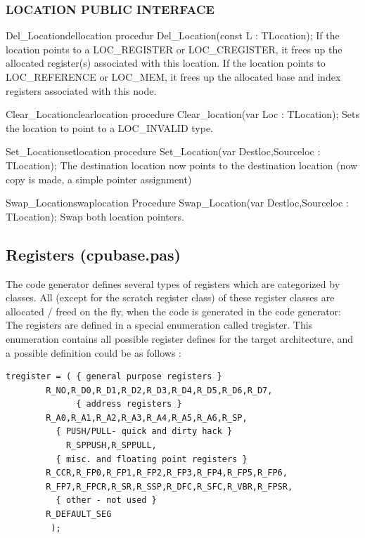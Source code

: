 \documentclass [a4paper,12pt]{article}
\begin{document}
\subsubsection{LOCATION PUBLIC INTERFACE}
\label{subsubsec:location}

\begin{procedurel}{Del{\_}Location}{dellocation}
\Declaration
procedur Del{\_}Location(const L : TLocation);
\Description
If the location points to a LOC{\_}REGISTER or LOC{\_}CREGISTER, it frees up
the allocated register(s) associated with this location. If the location
points to LOC{\_}REFERENCE or LOC{\_}MEM, it frees up the allocated base
and index registers associated with this node.
\end{procedurel}

\begin{procedurel}{Clear{\_}Location}{clearlocation}
\Declaration
procedure Clear{\_}location(var Loc : TLocation);
\Description
Sets the location to point to a LOC{\_}INVALID type.
\end{procedurel}

\begin{procedurel}{Set{\_}Location}{setlocation}
\Declaration
procedure Set{\_}Location(var Destloc,Sourceloc : TLocation);
\Description
The destination location now points to the destination location (now copy is
made, a simple pointer assignment)
\end{procedurel}

\begin{procedurel}{Swap{\_}Location}{swaplocation}
\Declaration
Procedure Swap{\_}Location(var Destloc,Sourceloc : TLocation);
\Description
Swap both location pointers.
\end{procedurel}

\subsection{Registers (cpubase.pas)}
\label{subsec:registers}

The code generator defines several types of registers which are categorized
by classes. All (except for the scratch register class) of these register
classes are allocated / freed on the fly, when the code is generated in the
code generator: The registers are defined in a special enumeration called
tregister. This enumeration contains all possible register defines for the
target architecture, and a possible definition could be as follows :

\begin{verbatim}
tregister = ( { general purpose registers }
        R_NO,R_D0,R_D1,R_D2,R_D3,R_D4,R_D5,R_D6,R_D7,
              { address registers }
        R_A0,R_A1,R_A2,R_A3,R_A4,R_A5,R_A6,R_SP,
          { PUSH/PULL- quick and dirty hack }
            R_SPPUSH,R_SPPULL,
          { misc. and floating point registers }
        R_CCR,R_FP0,R_FP1,R_FP2,R_FP3,R_FP4,R_FP5,R_FP6,
        R_FP7,R_FPCR,R_SR,R_SSP,R_DFC,R_SFC,R_VBR,R_FPSR,
          { other - not used }
        R_DEFAULT_SEG
         );

\end{verbatim}
\end{document}
